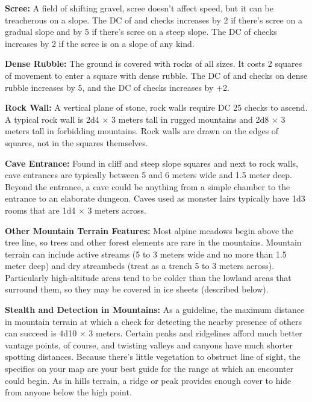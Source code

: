 \textbf{Scree:} A field of shifting gravel, scree doesn't affect speed, but it can be treacherous on a slope. The DC of  and  checks increases by 2 if there's scree on a gradual slope and by 5 if there's scree on a steep slope. The DC of  checks increases by 2 if the scree is on a slope of any kind.

\textbf{Dense Rubble:} The ground is covered with rocks of all sizes. It costs 2 squares of movement to enter a square with dense rubble. The DC of  and  checks on dense rubble increases by 5, and the DC of  checks increases by +2.

\textbf{Rock Wall:} A vertical plane of stone, rock walls require DC 25  checks to ascend. A typical rock wall is 2d4 $\times$ 3 meters tall in rugged mountains and 2d8 $\times$ 3 meters tall in forbidding mountains. Rock walls are drawn on the edges of squares, not in the squares themselves.

\textbf{Cave Entrance:} Found in cliff and steep slope squares and next to rock walls, cave entrances are typically between 5 and 6 meters wide and 1.5 meter deep. Beyond the entrance, a cave could be anything from a simple chamber to the entrance to an elaborate dungeon. Caves used as monster lairs typically have 1d3 rooms that are 1d4 $\times$ 3 meters across.

\textbf{Other Mountain Terrain Features:} Most alpine meadows begin above the tree line, so trees and other forest elements are rare in the mountains. Mountain terrain can include active streams (5 to 3 meters wide and no more than 1.5 meter deep) and dry streambeds (treat as a trench 5 to 3 meters across). Particularly high-altitude areas tend to be colder than the lowland areas that surround them, so they may be covered in ice sheets (described below).

\textbf{Stealth and Detection in Mountains:} As a guideline, the maximum distance in mountain terrain at which a  check for detecting the nearby presence of others can succeed is 4d10 $\times$ 3 meters. Certain peaks and ridgelines afford much better vantage points, of course, and twisting valleys and canyons have much shorter spotting distances. Because there's little vegetation to obstruct line of sight, the specifics on your map are your best guide for the range at which an encounter could begin. As in hills terrain, a ridge or peak provides enough cover to hide from anyone below the high point.

